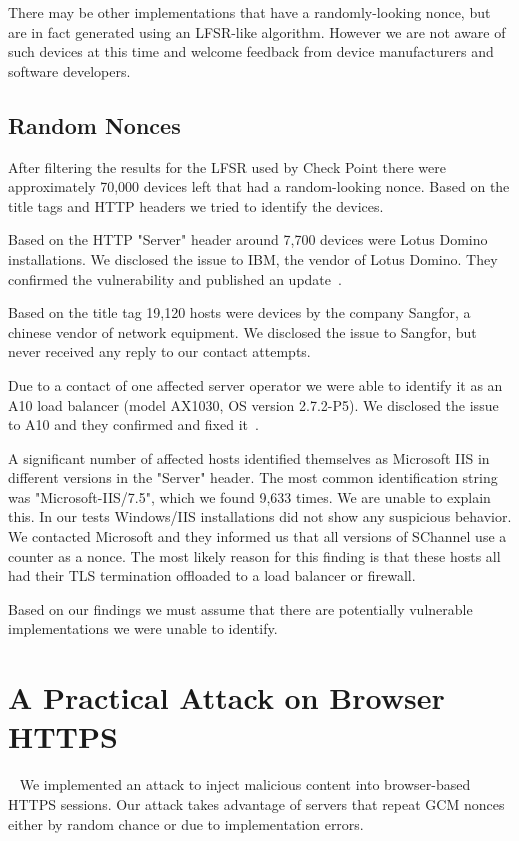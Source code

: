 There may be other implementations that have a randomly-looking nonce, but are in fact generated using an LFSR-like algorithm. However we are not aware of such devices at this time and welcome feedback from device manufacturers and software developers.

\subsection{Random Nonces}

After filtering the results for the LFSR used by Check Point there were approximately 70,000 devices left
that had a random-looking nonce. Based on the title tags and HTTP headers we tried to identify the devices.

Based on the HTTP "Server" header around 7,700 devices were Lotus Domino installations. We disclosed the issue to IBM, the vendor
of Lotus Domino. They confirmed the vulnerability and published an update~\cite{ibm2016}.

Based on the title tag 19,120 hosts were devices by the company Sangfor, a chinese vendor of network equipment.
We disclosed the issue to Sangfor, but never received any reply to our contact attempts.

Due to a contact of one affected server operator we were able to identify it as an A10 load balancer
(model AX1030, OS version 2.7.2-P5). We disclosed the issue to
A10 and they confirmed and fixed it~\cite{a102016}.

A significant number of affected hosts identified themselves as Microsoft IIS in different versions in the "Server" header. The most common identification string was "Microsoft-IIS/7.5", which we
found 9,633 times.
We are unable to explain this. In our tests Windows/IIS installations did not show any suspicious behavior.
We contacted Microsoft and they informed us that all versions of SChannel use a counter as a nonce.
The most likely reason for this finding is that
these hosts all had their TLS termination offloaded to a load balancer or firewall.

Based on our findings we must assume that there are potentially vulnerable implementations we were unable to identify.


\section{A Practical Attack on Browser HTTPS}~\label{sec:attack}
We implemented an attack to inject malicious content into browser-based HTTPS sessions. Our attack takes advantage of servers that repeat GCM nonces either by random chance or due to implementation errors.

